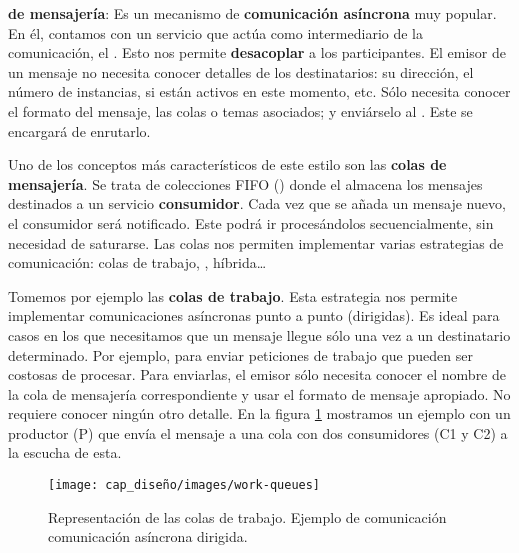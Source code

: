 \textbf{ de mensajería}: Es un mecanismo de \textbf{comunicación asíncrona} muy popular. En él, contamos con un servicio que actúa como intermediario de la comunicación, el \textbf{}. \cite{newmanBuildingMicroservicesDesigning2021} Esto nos permite \textbf{desacoplar} a los participantes. \cite{korabUnderstandingMessageBrokers2017} El emisor de un mensaje no necesita conocer detalles de los destinatarios: su dirección, el número de instancias, si están activos en este momento, etc. Sólo necesita conocer el formato del mensaje, las colas o temas asociados; y enviárselo al . Este se encargará de enrutarlo.

Uno de los conceptos más característicos de este estilo son las \textbf{colas de mensajería}. Se trata de colecciones FIFO () donde el  almacena los mensajes destinados a un servicio \textbf{consumidor}. Cada vez que se añada un mensaje nuevo, el consumidor será notificado. Este podrá ir procesándolos secuencialmente, sin necesidad de saturarse. Las colas nos permiten implementar varias estrategias de comunicación: colas de trabajo, , híbrida\dots

Tomemos por ejemplo las \textbf{colas de trabajo}. \cite{royChapterMessagePatterns2017} Esta estrategia nos permite implementar comunicaciones asíncronas punto a punto (dirigidas). Es ideal para casos en los que necesitamos que un mensaje llegue sólo una vez a un destinatario determinado. \cite{ibmWhatAreMessage2020} Por ejemplo, para enviar peticiones de trabajo que pueden ser costosas de procesar. Para enviarlas, el emisor sólo necesita conocer el nombre de la cola de mensajería correspondiente y usar el formato de mensaje apropiado. No requiere conocer ningún otro detalle. En la figura \ref{fig:work-queues} mostramos un ejemplo con un productor (P) que envía el mensaje a una cola con dos consumidores (C1 y C2) a la escucha de esta.

\begin{figure}[htb]
  \centering
  \texttt{[image: cap\_diseño/images/work-queues]}
  \caption[Representación de las colas de trabajo. Ejemplo de comunicación asíncrona dirigida.]{Representación de las colas de trabajo. Ejemplo de comunicación comunicación asíncrona dirigida. \footnotemark }
  \label{fig:work-queues}
\end{figure}


